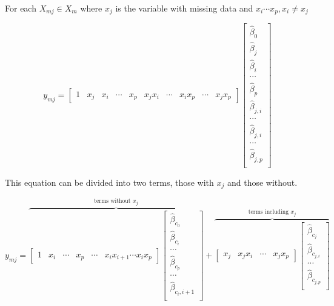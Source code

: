 \documentclass[../../paper.tex]{subfiles}
\begin{document}
For each $X_{mj} \in X_{m}$ where $x_{j}$ is the variable with missing data and $x_{i} \cdots x_{p}, x_{i} \neq x_{j}$



\begin{equation}
  y_{mj} =
  \begin{bmatrix}
    1 & x_{j} & x_{i} & \cdots & x_{p} & x_{j}x_{i} & \cdots & x_{i}x_{p} & \cdots & x_{j}x_{p}
  \end{bmatrix}
  \begin{bmatrix}
    \hat{\beta}_{0} \\
    \hat{\beta}_{j} \\
    \hat{\beta}_{i} \\
    \cdots \\
    \hat{\beta}_{p} \\
    \hat{\beta}_{j,i} \\
    \cdots \\
    \hat{\beta}_{j,i} \\
    \cdots \\
    \hat{\beta}_{j, p} \\

  \end{bmatrix}
\end{equation}

This equation can be divided into two terms, those with $x_{j}$ and those without.

\begin{equation}
  y_{mj} =
\overbrace{
  \begin{bmatrix}
    1 & x_{i} & \cdots & x_{p} &  \cdots & x_{i}x_{i+1} \cdots  x_{i}x_{p}
  \end{bmatrix}
  \begin{bmatrix}
    \hat{\beta}_{c_0} \\
    \hat{\beta}_{c_i} \\
    \cdots \\
    \hat{\beta}_{c_p} \\
    \cdots \\
    \hat{\beta}_{c_i,i+1} \\
  \end{bmatrix}}^{\text{terms without } x_{j}}
   +
  \overbrace{
  \begin{bmatrix}
    x_{j} & x_{j}x_{i} & \cdots & x_{j}x_{p}
  \end{bmatrix}
  \begin{bmatrix}
    \hat{\beta}_{c_{j}} \\
    \hat{\beta}_{c_{j,i}} \\
    \cdots \\
    \hat{\beta}_{c_{j,p}} \\
  \end{bmatrix}}^{\text{terms including } x_{j}}
\end{equation}
\end{document}
